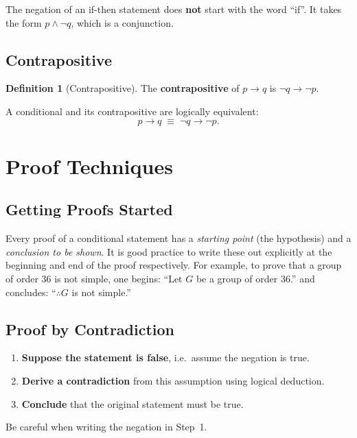 \documentclass[11pt, a4paper, notitlepage]{report}
\theoremstyle{definition}
\newtheorem{definition}[theorem]{Definition}
\theoremstyle{remark}
\begin{document}
\begin{warning}[title={Warning: Negating an If-Then Statement}]
The negation of an if-then statement does \textbf{not} start with the word ``if''. It takes
the form $p \land \lnot q$, which is a conjunction.
\end{warning}

\subsection{Contrapositive}

\begin{definition}[Contrapositive]
\label{def:contrapositive}
The \textbf{contrapositive} of $p \to q$ is $\lnot q \to \lnot p$.
\end{definition}

A conditional and its contrapositive are logically equivalent:
\[
  p \to q \;\equiv\; \lnot q \to \lnot p.
\]

\section{Proof Techniques}
\label{sec:proofs}

\subsection{Getting Proofs Started}

Every proof of a conditional statement has a \emph{starting point} (the hypothesis) and a
\emph{conclusion to be shown}. It is good practice to write these out explicitly at the
beginning and end of the proof respectively. For example, to prove that a group of order 36
is not simple, one begins: ``Let $G$ be a group of order 36.'' and concludes:
``$\therefore G$ is not simple.''

\subsection{Proof by Contradiction}

\begin{keyresult}[title={Method: Proof by Contradiction}]
\begin{enumerate}[nosep]
  \item \textbf{Suppose the statement is false}, i.e.\ assume the negation is true.
  \item \textbf{Derive a contradiction} from this assumption using logical deduction.
  \item \textbf{Conclude} that the original statement must be true.
\end{enumerate}
Be careful when writing the negation in Step~1.
\end{keyresult}
\end{document}
